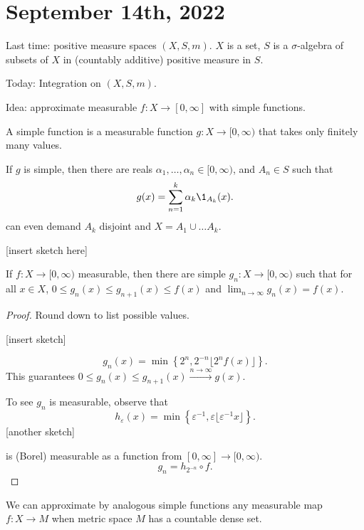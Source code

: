 \section{September 14th, 2022}

Last time: positive measure spaces $(X, S, m)$. $X$ is a set, $S$ is a $\sigma$-algebra of subsets of $X$ in (countably additive) positive measure in $S$.

Today: Integration on $(X, S, m)$.

Idea: approximate measurable $f : X \to [0, \infty]$ with simple functions.

\begin{definition}
	A simple function is a measurable function $g : X \to [0, \infty)$ that takes only finitely many values.
\end{definition}

If $g$ is simple, then there are reals $\alpha_1, \ldots, \alpha_n \in [0, \infty)$, and $A_n \in S$ such that
\[
	g(x) = \sum_{n = 1}^{k} \alpha_k \1_{A_k}(x).
\]
can even demand $A_k$ disjoint and $X = A_1 \cup \ldots A_k$.

[insert sketch here]

\begin{theorem}
	If $f : X \to [0, \infty)$ measurable, then there are simple $g_n : X \to [0, \infty)$ such that for all $x \in X$, $0 \leq g_n(x) \leq g_{n+1}(x) \leq f(x)$ and $\lim_{n \to \infty} g_n(x) = f(x)$.
\end{theorem}

\begin{proof}
  Round down to list possible values.

	[insert sketch]

	\[
		g_n(x) = \min \left\{2^n, 2^{-n} \lfloor 2^n f(x) \rfloor \right\}.
	\]
	This guarantees $0 \leq g_n(x) \leq g_{n+1}(x) \xrightarrow{n \to \infty} g(x)$.

	To see $g_n$ is measurable, observe that
	\[
		h_\varepsilon (x) = \min \left\{\varepsilon^{-1}, \varepsilon \lfloor \varepsilon^{-1} x \rfloor\right\}.
	\]
	[another sketch]

	is (Borel) measurable as a function from $[0, \infty] \to [0, \infty)$.
	\[
		g_n = h_{2^{-n}} \circ f.
	\]
\end{proof}

\begin{remark}
  We can approximate by analogous simple functions any measurable map $f : X \to M$ when metric space $M$ has a countable dense set.
\end{remark}

